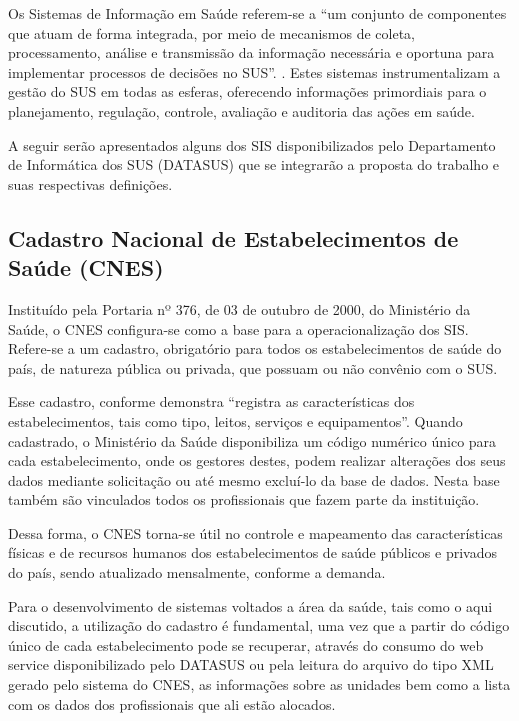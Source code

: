 Os Sistemas de Informação em Saúde referem-se a ``um conjunto de componentes que atuam de forma integrada, por meio de mecanismos de coleta, processamento, análise e transmissão da informação necessária e oportuna para implementar processos de decisões no SUS''. \cite[p. 12]{garcia}. Estes sistemas instrumentalizam a gestão do SUS em todas as esferas, oferecendo informações primordiais para o planejamento, regulação, controle, avaliação e auditoria das ações em saúde.

A seguir serão apresentados alguns dos SIS disponibilizados pelo Departamento de Informática dos SUS (DATASUS) que se integrarão a proposta do trabalho e suas respectivas definições.

\subsection{\textbf{Cadastro Nacional de Estabelecimentos de Saúde (CNES)}}

Instituído pela Portaria nº 376, de 03 de outubro de 2000, do Ministério da Saúde, o CNES configura-se como a base para a operacionalização dos SIS. Refere-se a um cadastro, obrigatório para todos os estabelecimentos de saúde do país, de natureza pública ou privada, que possuam ou não convênio com o SUS.

Esse cadastro, conforme demonstra  ``registra as características dos estabelecimentos, tais como tipo, leitos, serviços e equipamentos''. Quando cadastrado, o Ministério da Saúde disponibiliza um código numérico único para cada estabelecimento, onde os gestores destes, podem realizar alterações dos seus dados mediante solicitação ou até mesmo excluí-lo da base de dados. Nesta base também são vinculados todos os profissionais que fazem parte da instituição.

Dessa forma, o CNES torna-se útil no controle e mapeamento das características físicas e de recursos humanos dos estabelecimentos de saúde públicos e privados do país, sendo atualizado mensalmente, conforme a demanda.

Para o desenvolvimento de sistemas voltados a área da saúde, tais como o aqui discutido, a utilização do cadastro é fundamental, uma vez que a partir do código único de cada estabelecimento pode se recuperar, através do consumo do web service disponibilizado pelo DATASUS ou pela leitura do arquivo do tipo XML gerado pelo sistema do CNES, as informações sobre as unidades bem como a lista com os dados dos profissionais que ali estão alocados.

